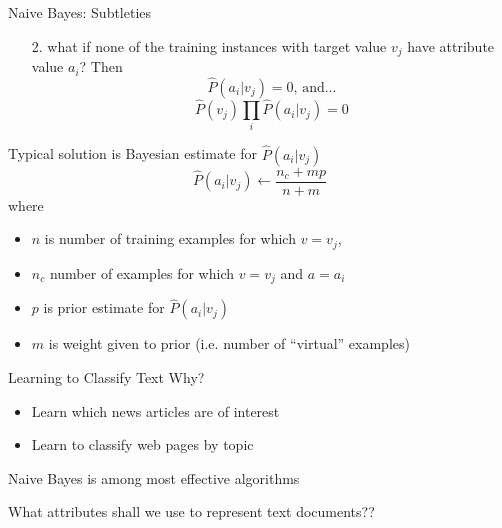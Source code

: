 \documentclass[%
pdf,
colorBG,
slideColor,
tcrico,
]{prosper}
\begin{document}


\begin{slide}{ Naive Bayes: Subtleties   }  
\tiny
\begin{enumerate}
\item[2.]
what if none of the training instances with target value $v_j$ have attribute
value $a_i$?  Then
\[ \hat{P}(a_i|v_j) = 0 \mbox{, and...}\]
\[ \hat{P}(v_{j}) \prod_{i} \hat{P}(a_{i} | v_{j}) = 0 \]
\end{enumerate}

Typical solution is Bayesian estimate for $\hat{P}(a_{i} | v_{j})$
\[  \hat{P}(a_{i} | v_{j}) \gets \frac{n_{c} + mp}{n + m} \]
where 
\begin{itemize}
\item
$n$ is number of training examples for which $v=v_j$, 
\item $n_c$ number of examples for which $v=v_j$ and $a=a_i$
\item $p$ is prior estimate for $\hat{P}(a_{i} | v_{j})$
\item $m$ is weight given to prior (i.e. number of ``virtual'' examples)
\end{itemize}
\end{slide}


\begin{slide}{Learning to Classify Text}
Why?
\begin{itemize}
\item Learn which news articles are of interest
\item Learn to classify web pages by topic
\end{itemize}

Naive Bayes is among most effective algorithms

\bigskip
What attributes shall we use to represent text documents??
\end{slide}

\end{document}

